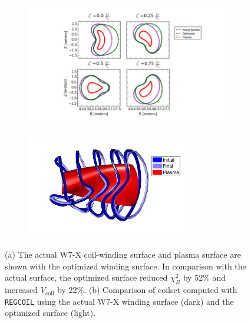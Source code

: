 \documentclass[aps,unsortedaddress]{revtex4-1}
\begin{document}
\FloatBarrier
\begin{figure}
\begin{subfigure}[b]{0.8\textwidth}
\includegraphics[width=1\textwidth]{w7x_opt_surf.png}
\caption{}
\end{subfigure}
\begin{subfigure}[b]{0.8\textwidth}
\includegraphics[width=0.8\textwidth]{w7x_opt_coils.png}
\caption{}
\end{subfigure}
\caption{(a) The actual W7-X coil-winding surface and plasma surface are shown with the optimized winding surface. In comparison with the actual surface, the optimized surface reduced $\chi^2_B$ by 52\% and increased $V_{\text{coil}}$ by 22\%. (b) Comparison of coilset computed with \texttt{REGCOIL} using the actual W7-X winding surface (dark) and the optimized surface (light).}
\label{fig_w7x}
\end{figure}
\end{document}
